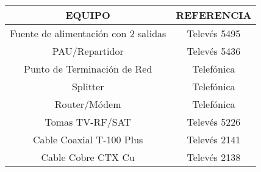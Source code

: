 \documentclass{article}[12 pt]
\begin{document}
		\begin{tabular}{| c | c |}
			\hline
			\textbf{EQUIPO} & \textbf{REFERENCIA}\\
			\hline
			Fuente de alimentación con 2 salidas & Televés 5495\\
			\hline
			PAU/Repartidor & Televés 5436\\
			\hline
			Punto de Terminación de Red & Telefónica\\
			\hline
			Splitter & Telefónica\\
			\hline
			Router/Módem & Telefónica\\
			\hline
			Tomas TV-RF/SAT & Televés 5226\\
			\hline
			Cable Coaxial T-100 Plus  & Televés 2141\\
			\hline
			Cable Cobre CTX Cu & Televés 2138\\
			\hline
		\end{tabular}
\end{document}
